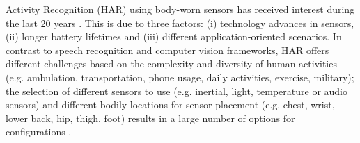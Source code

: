 \documentclass[10pt,journal,compsoc]{IEEEtran}
\begin{document}

% 
% 
% 
% 


 Activity Recognition (HAR) using body-worn sensors 
has received interest during the last 20 years \cite{bulling2014, Lara2013}. 
This is due to three factors: (i) technology advances in sensors, 
(ii) longer battery lifetimes and  (iii) different application-oriented scenarios.
In contrast to speech recognition and computer vision frameworks, HAR offers different 
challenges based on the complexity and diversity of human activities 
(e.g. ambulation, transportation, phone usage, daily activities, exercise, military);
the selection of different sensors to use (e.g. inertial, light, temperature or audio sensors)
\cite{Lara2013} and different bodily locations for sensor placement 
(e.g. chest, wrist, lower back, hip, thigh, foot) \cite{Cleland2013}
results in a large number of options for configurations \cite{Mannini2013}.
\end{document}
